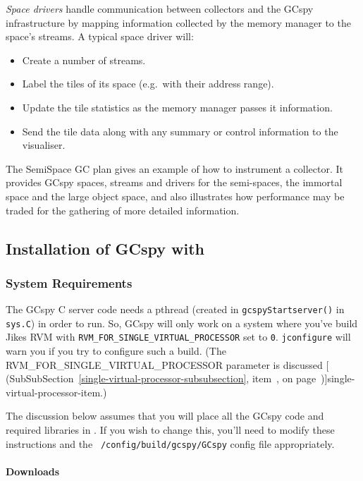 \textit{Space drivers} handle communication between collectors and the GCspy
infrastructure by mapping information collected by the memory manager
to the space's streams.  A typical space driver will:

\begin{itemize}
   \item Create a number of streams.
   \item Label the tiles of its space (e.g.\ with their address range).
   \item Update the tile statistics as the memory manager passes it information.
   \item Send the tile data along with any summary or control information to the visualiser. 
\end{itemize}

The \jrvm{} SemiSpace GC plan gives an example of how to instrument a
collector.  It provides GCspy spaces, streams and drivers for the
semi-spaces, the immortal space and the large object space, and also
illustrates how performance may be traded for the gathering of more
detailed information.

\subsection{Installation of GCspy with \jrvm{}}


\subsubsection{System Requirements}

The GCspy C server code needs a pthread (created in
\texttt{gcspyStartserver()} in \texttt{sys.C}) in order to run.
So, GCspy will only work on a system where you've build Jikes RVM with
\texttt{RVM\_FOR\_SINGLE\_VIRTUAL\_PROCESSOR} set to \texttt{0}.
\texttt{jconfigure} will warn you if you try to configure such a build.
(The RVM\_FOR\_SINGLE\_VIRTUAL\_PROCESSOR parameter is discussed
  [
  (SubSubSection~\ref{single-virtual-processor-subsubsection},
  item~\Ref, on page~\Pageref)]{single-virtual-processor-item}.)

The discussion below assumes that you will place all the
GCspy code and required libraries in \rvmRoot.  If you wish to change
this, you'll need to modify these instructions and the {\tt
  \rvmRoot/config/build/gcspy/GCspy} config file appropriately. 

\paragraph{Downloads}


